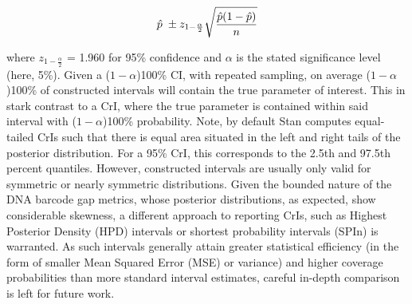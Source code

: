 \documentclass[12pt]{article}
\begin{document}
\begin{equation}
\hat{p} \hspace{1mm} \pm z_{1 - \frac{\alpha}{2}}\sqrt{\frac{\hat{p}(1 - \hat{p})}{n}}
\end{equation}

\noindent where $z_{1 - \frac{\alpha}{2}}$ = 1.960 for 95\% confidence and $\alpha$ is the stated significance level (here, 5\%). Given a ($1 - \alpha$)100\% CI, with repeated sampling, on average ($1 - \alpha$)100\% of constructed intervals will contain the true parameter of interest. This in stark contrast to a CrI, where the true parameter is contained within said interval with ($1 - \alpha$)100\% probability. Note, by default Stan computes equal-tailed CrIs such that there is equal area situated in the left and right tails of the posterior distribution. For a 95\% CrI, this corresponds to the 2.5th and 97.5th percent quantiles. However, constructed intervals are usually only valid for symmetric or nearly symmetric distributions. Given the bounded nature of the DNA barcode gap metrics, whose posterior distributions, as expected, show considerable skewness, a different approach to reporting CrIs, such as Highest Posterior Density (HPD) intervals \citep{chen1999monte} or shortest probability intervals (SPIn) \citep{liu2015simulation} is warranted. As such intervals generally attain greater statistical efficiency (in the form of smaller Mean Squared Error (MSE) or variance) and higher coverage probabilities than more standard interval estimates, careful in-depth comparison is left for future work. 
\end{document}
